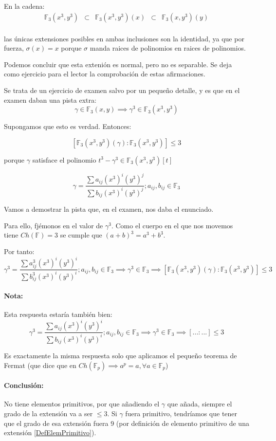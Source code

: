 \begin{problem}[3]
En la cadena:
$$\begin{array}{ccccc}\mathbb{F}_3(x^3,y^3) &\subset& \mathbb{F}_3(x^3,y^3)(x) &\subset& \mathbb{F}_3(x,y^3)(y)\\
\end{array}$$

las únicas extensiones posibles en ambas inclusiones son la identidad, ya que por fuerza, $σ(x) = x$ porque $σ$ manda raices de polinomios en raices de polinomios.


Podemos concluir que esta extenión es normal, pero no es separable. Se deja como ejercicio para el lector la comprobación de estas afirmaciones.

\spart Se trata de un ejercicio de examen salvo por un pequeño detalle, y es que en el examen daban una pista extra:
\[γ∈\mathbb{F}_3(x,y) \implies γ^3 ∈\mathbb{F}_3(x^3,y^3)\]

Supongamos que esto es verdad. Entonces:

\[[\mathbb{F}_3(x^3,y^3)(γ) : \mathbb{F}_3(x^3,y^3)] ≤ 3\]

porque $γ$ satisface el polinomio $t^3 -γ^3 ∈ \mathbb{F}_3(x^3,y^3)[t]$

\[γ = \frac{\sum a_{ij}(x^3)^i(y^3)^j}{\sum b_{ij}(x^3)^i(y^3)^j}; a_{ij},b_{ij} ∈ \mathbb{F}_3\]

Vamos a demostrar la pista que, en el examen, nos daba el enunciado.

Para ello, fjémonos en el valor de $γ^3$. Como el cuerpo en el que nos movemos tiene $Ch(\mathbb{F}) = 3$ se cumple que $(a+b)^{3} = a^3 + b^3$.

Por tanto:
\[γ^3 = \frac{\sum a_{ij}^3(x^3)^i(y^3)^i}{\sum b_{ij}^3(x^3)^i(y^3)^i}; a_{ij},b_{ij} ∈ \mathbb{F}_3 \implies γ^3 ∈ \mathbb{F}_3 \implies [\mathbb{F}_3(x^3,y^3)(γ) : \mathbb{F}_3(x^3,y^3)] ≤ 3\]

\paragraph{Nota:} Esta respuesta estaría también bien:
$$γ^3 = \frac{\sum a_{ij}(x^3)^i(y^3)^i}{\sum b_{ij}(x^3)^i(y^3)^i}; a_{ij},b_{ij} ∈ \mathbb{F}_3 \implies γ^3 ∈ \mathbb{F}_3 \implies [... : ...] ≤ 3$$

Es exactamente la misma respuesta solo que aplicamos el pequeño teorema de Fermat (que dice que en $Ch(\mathbb{F}_p) \implies a^p = a, ∀a∈\mathbb{F}_p$)


\paragraph{Conclusión:} No tiene elementos primitivos, por que añadiendo el $γ$ que añada, siempre el grado de la extensión va a ser $≤3$. Si $γ$ fuera primitivo, tendríamos que tener que el grado de esa extensión fuera 9 (por definición de elemento primitivo de una extensión \ref{DefElemPrimitivo}).

\end{problem}


